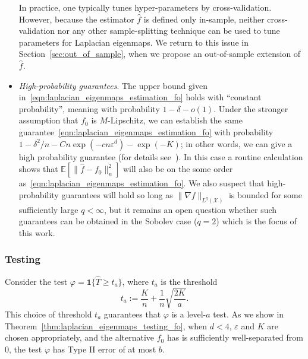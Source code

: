 \documentclass[aos]{imsart}
\theoremstyle{plain}
\theoremstyle{definition}
\theoremstyle{remark}
\newcommand{\Ebb}{\mathbb{E}}
\newcommand{\wh}[1]{\widehat{#1}}
\newcommand{\mc}[1]{\mathcal{#1}}
\newcommand{\1}{\mathbf{1}}
\begin{document}
\begin{itemize}
	In practice, one typically tunes hyper-parameters by cross-validation. However, because the estimator $\wh{f}$ is defined only in-sample, neither cross-validation nor any other sample-splitting technique can be used to tune parameters for Laplacian eigenmaps. We return to this issue in Section~\ref{sec:out_of_sample}, when we propose an out-of-sample extension of $\wh{f}$. 
	
	\item \emph{High-probability guarantees}. The upper bound given in~\eqref{eqn:laplacian_eigenmaps_estimation_fo} holds with ``constant probability'', meaning with probability $1 - \delta - o(1)$. Under the stronger assumption that $f_0$ is $M$-Lipschitz, we can establish the same guarantee~\eqref{eqn:laplacian_eigenmaps_estimation_fo} with probability $1 - \delta^2/n - Cn\exp(-cn\varepsilon^d) - \exp(-K)$; in other words, we can give a high probability guarantee (for details see~\cite{green2021}). In this case a routine calculation shows that $\Ebb[\|\wh{f} - f_0\|_n^2]$ will also be on the some order as~\eqref{eqn:laplacian_eigenmaps_estimation_fo}. We also suspect that high-probability guarantees will hold so long as $\|\nabla f\|_{L^q(\mc{X})}$ is bounded for some sufficiently large $q < \infty$, but it remains an open question whether such guarantees can be obtained in the Sobolev case ($q = 2$) which is the focus of this work. 
\end{itemize}

\subsubsection{Testing} Consider the test $\varphi = \1\{\wh{T} \geq t_{a}\}$, where $t_{a}$ is the threshold
\begin{equation*}
t_{a} := \frac{K}{n} + \frac{1}{n}\sqrt{\frac{2K}{a}}.
\end{equation*}
This choice of threshold $t_{a}$ guarantees that $\varphi$ is a level-$a$ test. As we show in Theorem~\ref{thm:laplacian_eigenmaps_testing_fo}, when $d < 4$, $\varepsilon$ and $K$ are chosen appropriately, and the alternative $f_0$ has is sufficiently well-separated from $0$, the test $\varphi$ has Type II error of at most $b$.
\end{document}
